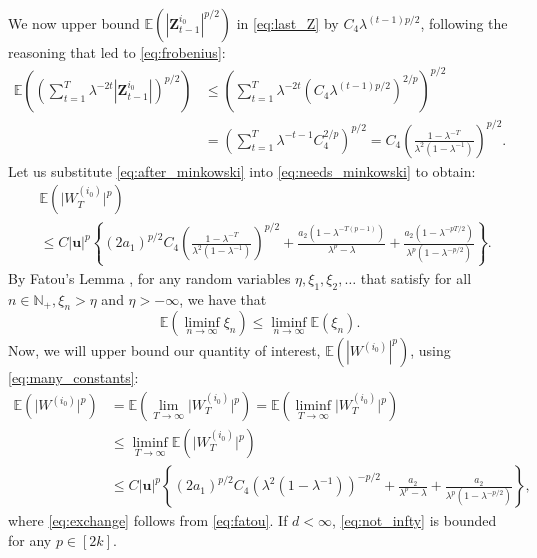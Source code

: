 \documentclass[preprint,3p,12pt]{elsarticle}
\theoremstyle{definition}
\begin{document}
We now upper bound $\mathbb{E}\left(|\boldsymbol{Z}_{t-1}^{i_0}|^{p/2}\right)$ in \eqref{eq:last_Z} by $C_4 \lambda^{(t-1)p/2}$, following the reasoning that led to \eqref{eq:frobenius}:
\begin{align}
\mathbb{E}\left(\left(\sum_{t=1}^T \lambda^{-2t}|\boldsymbol{Z}_{t-1}^{i_0}| \right)^{p/2}\right) 
& \le \left(\sum_{t=1}^T \lambda^{-2t}(C_4 \lambda^{(t-1)p/2} )^{2/p}\right)^{p/2} \nonumber\\
&=  \left(\sum_{t=1}^T \lambda^{-t-1}C_4^{2/p} \right)^{p/2}
= C_4\left(\frac{1-\lambda^{-T}}{\lambda^2(1-\lambda^{-1})} \right)^{p/2} \label{eq:after_minkowski}.
\end{align}
Let us substitute \eqref{eq:after_minkowski} into \eqref{eq:needs_minkowski} to obtain:
\begin{align}
   & \mathbb{E}\left(\lvert W_T^{(i_0)}\rvert^p\right)\nonumber \\
& \le C |\boldsymbol{u}|^{p} \left\{ (2a_1)^{p/2} C_4
\left(\frac{1-\lambda^{-T}}{\lambda^2(1-\lambda^{-1})} \right)^{p/2}  +  \frac{a_2  (1-\lambda^{-T(p-1)})}{\lambda^{p}-\lambda} + \frac{a_2 (1-\lambda^{-pT/2})}{\lambda^p(1-\lambda^{-p/2})}
\right\}\label{eq:many_constants}.
\end{align}
By Fatou's Lemma \cite[Chapter 6, Theorem 2]{shiryaev}, for any random variables $\eta, \xi_1, \xi_2,\dots$ that satisfy for all $n \in \mathbb{N}_+$$, \xi_n > \eta$ and $\mathbb{\eta} > -\infty$, we have that 
\begin{equation}
    \mathbb{E}\left(\liminf_{n\to\infty} \xi_n\right)\le \liminf_{n\to\infty} \mathbb{E}(\xi_n) \label{eq:fatou}.
\end{equation}
Now, we will upper bound our quantity of interest, $\mathbb{E}(|W^{(i_0)}|^p)$, using \eqref{eq:many_constants}:
\begin{align}
 \mathbb{E}(\lvert W^{(i_0)}\rvert^p) &=\mathbb{E}\left(\lim_{T \rightarrow \infty}\lvert W_T^{(i_0)}\rvert^p\right) =\mathbb{E}\left(\liminf_{T \rightarrow \infty}\lvert W_T^{(i_0)}\rvert^p\right) \nonumber \\
    &\le \liminf_{T \rightarrow \infty}\mathbb{E}(\lvert W_T^{(i_0)}\rvert^p)\label{eq:exchange}  \\
& \le C |\boldsymbol{u}|^{p} \left\{ (2a_1)^{p/2} C_4 (\lambda^2(1-\lambda^{-1}))^{-p/2}  +  \frac{a_2}{\lambda^{p}-\lambda} + \frac{a_2}{\lambda^p(1-\lambda^{-p/2})}
\right\}, \label{eq:not_infty}
\end{align}
where \eqref{eq:exchange} follows from \eqref{eq:fatou}. If $d < \infty$, \eqref{eq:not_infty} is bounded for any $p \in [2k]$.
\end{document}

